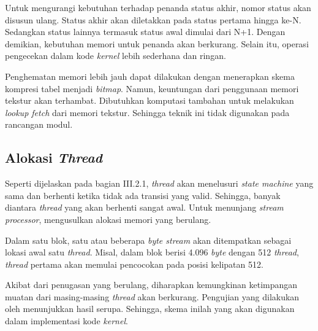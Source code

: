       Untuk mengurangi kebutuhan terhadap penanda status akhir, nomor status akan disusun ulang. Status akhir akan diletakkan pada status pertama hingga ke-N. Sedangkan status lainnya termasuk status awal dimulai dari N+1. Dengan demikian, kebutuhan memori untuk penanda akan berkurang. Selain itu, operasi pengecekan dalam kode \emph{kernel} lebih sederhana dan ringan.

      Penghematan memori lebih jauh dapat dilakukan dengan menerapkan skema kompresi tabel menjadi \emph{bitmap}. Namun, keuntungan dari penggunaan memori tekstur akan terhambat. Dibutuhkan komputasi tambahan untuk melakukan \emph{lookup fetch} dari memori tekstur. Sehingga teknik ini tidak digunakan pada rancangan modul.

      \subsection{Alokasi \emph{Thread}}

      Seperti dijelaskan pada bagian III.2.1, \emph{thread} akan menelusuri \emph{state machine} yang sama dan berhenti ketika tidak ada transisi yang valid. Sehingga, banyak diantara \emph{thread} yang akan berhenti sangat awal. Untuk menunjang \emph{stream processor}, \cite{lin2013} mengusulkan alokasi memori yang berulang.

      Dalam satu blok, satu atau beberapa \emph{byte stream} akan ditempatkan sebagai lokasi awal satu \emph{thread}. Misal, dalam blok berisi 4.096 \emph{byte} dengan 512 \emph{thread}, \emph{thread} pertama akan memulai pencocokan pada posisi kelipatan 512. 

      Akibat dari penugasan yang berulang, diharapkan kemungkinan ketimpangan muatan dari masing-masing \emph{thread} akan berkurang. Pengujian yang dilakukan oleh \cite{lin2013} menunjukkan hasil serupa. Sehingga, skema inilah yang akan digunakan dalam implementasi kode \emph{kernel}. %
      
      
      
